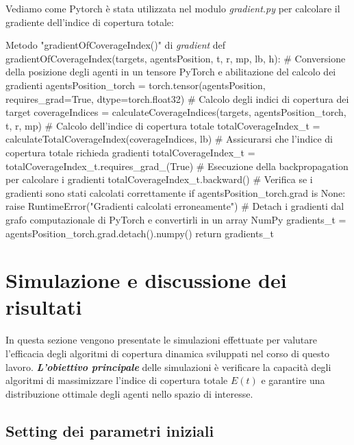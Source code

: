 \documentclass[twoside]{article}
\begin{document}
\vspace{\baselineskip}

Vediamo come Pytorch è stata utilizzata nel modulo \textit{gradient.py} per calcolare il gradiente dell'indice di copertura totale:

\begin{code}{Metodo "gradientOfCoverageIndex()" di \textit{gradient}}
def gradientOfCoverageIndex(targets, agentsPosition, t, r, mp, lb, h):
    # Conversione della posizione degli agenti in un tensore PyTorch e abilitazione del calcolo dei gradienti
    agentsPosition_torch = torch.tensor(agentsPosition, requires_grad=True, dtype=torch.float32)
    # Calcolo degli indici di copertura dei target
    coverageIndices = calculateCoverageIndices(targets, agentsPosition_torch, t, r, mp)
    # Calcolo dell'indice di copertura totale
    totalCoverageIndex_t = calculateTotalCoverageIndex(coverageIndices, lb)
    # Assicurarsi che l'indice di copertura totale richieda gradienti
    totalCoverageIndex_t = totalCoverageIndex_t.requires_grad_(True)
    # Esecuzione della backpropagation per calcolare i gradienti
    totalCoverageIndex_t.backward()
    # Verifica se i gradienti sono stati calcolati correttamente
    if agentsPosition_torch.grad is None:
        raise RuntimeError("Gradienti calcolati erroneamente")
    # Detach i gradienti dal grafo computazionale di PyTorch e convertirli in un array NumPy
    gradients_t = agentsPosition_torch.grad.detach().numpy()
    return gradients_t
\end{code}

\clearpage


\section{Simulazione e discussione dei risultati}\label{section: simulazione}

\vspace{\baselineskip}

In questa sezione vengono presentate le simulazioni effettuate per valutare l'efficacia degli algoritmi di copertura dinamica sviluppati nel corso di questo lavoro. \textit{\textbf{L'obiettivo principale}} delle simulazioni è verificare la capacità degli algoritmi di massimizzare l'indice di copertura totale \ensuremath{E(t)} e garantire una distribuzione ottimale degli agenti nello spazio di interesse.

\subsection{Setting dei parametri iniziali}\label{section: settingParametriIniziali}
\end{document}
